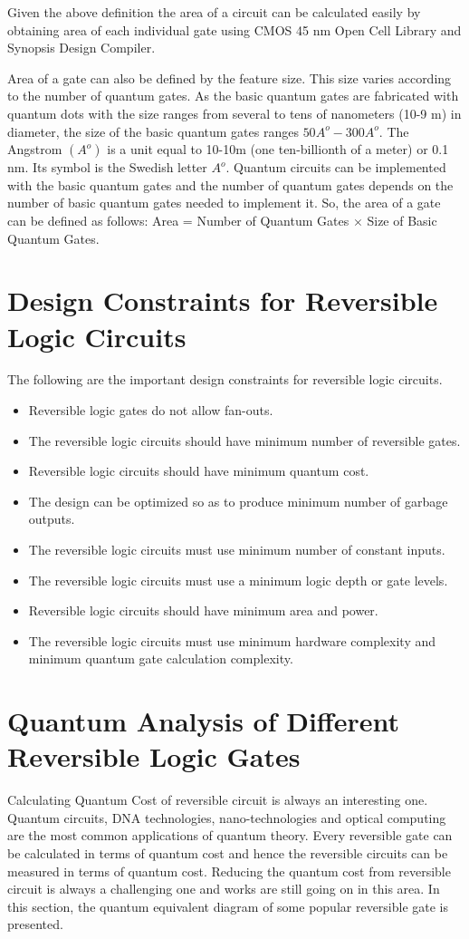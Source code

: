 Given the above definition the area of a circuit can be calculated easily by obtaining area of each individual gate using CMOS 45 nm Open Cell Library and Synopsis Design Compiler. 

Area of a gate can also be defined by the feature size. This size varies according to the number of quantum gates. As the basic quantum gates are fabricated with quantum dots with the size ranges from several to tens of nanometers (10-9 m) in diameter, the size of the basic quantum gates ranges $50A^o-300A^o$. The Angstrom $(A^o)$ is a unit equal to 10-10m (one ten-billionth of a meter) or 0.1 nm. Its symbol is the Swedish letter $A^o$. Quantum circuits can be implemented with the basic quantum gates and the number of quantum gates depends on the number of basic quantum gates needed to implement it. So, the area of a gate can be defined as follows: Area = Number of Quantum Gates $\times$ Size of Basic Quantum Gates. 

\section{Design Constraints for Reversible Logic Circuits}
The following are the important design constraints for reversible logic circuits.

\begin{itemize}
	\item Reversible logic gates do not allow fan-outs.
	\item The reversible logic circuits should have minimum number of reversible gates.
	\item Reversible logic circuits should have minimum quantum cost.
	\item The design can be optimized so as to produce minimum number of garbage outputs.
	\item The reversible logic circuits must use minimum number of constant inputs.
	\item The reversible logic circuits must use a minimum logic depth or gate levels.
	\item Reversible logic circuits should have minimum area and power.
	\item The reversible logic circuits must use minimum hardware complexity and minimum quantum gate calculation complexity.
\end{itemize}

\section{Quantum Analysis of Different Reversible Logic Gates}
Calculating Quantum Cost of reversible circuit is always an interesting one. Quantum circuits, DNA technologies, nano-technologies and optical computing are the most common applications of quantum theory. Every reversible gate can be calculated in terms of quantum cost and hence the reversible circuits can be measured in terms of quantum cost. Reducing the quantum cost from reversible circuit is always a challenging one and works are still going on in this area. In this section, the quantum equivalent diagram of some popular reversible gate is presented.

